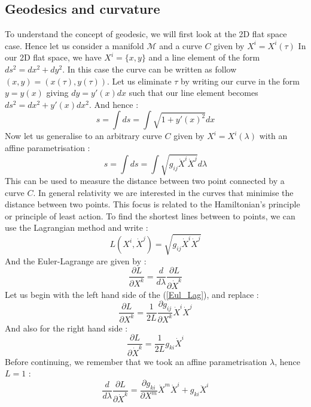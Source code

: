 \documentclass[a4paper,12pt]{article}
\theoremstyle{definition}
\begin{document}
\subsection{Geodesics and curvature}
To understand the concept of geodesic, we will first look at the 2D flat space case.
Hence let us consider a manifold $\mathcal{M}$ and a curve $C$ given by $X^i=X^i(\tau)$
In our 2D flat space, we have $X^i=\{x,y\}$ and a line element of the form $ds^2=dx^2+dy^2$.
In this case the curve can be written as follow $(x,y)=(x(\tau),y(\tau))$.
Let us eliminate $\tau$ by writing our curve in the form $y=y(x)$ giving $dy=y'(x)dx$ such that our line element becomes $ds^2=dx^2+y'(x)dx^2$.
And hence :
\begin{equation*}
	s=\int ds=\int \sqrt{1+y'(x)^2}dx
\end{equation*}
Now let us generalise to an arbitrary curve $C$ given by $X^i=X^i(\lambda)$ with an affine parametrisation :
\begin{equation*}
	s=\int ds=\int \sqrt{g_{ij}\dot{X}^i\dot{X}^j}d\lambda
\end{equation*}
This can be used to measure the distance between two point connected by a curve $C$.
In general relativity we are interested in the curves that minimise the distance between two points.
This focus is related to the Hamiltonian's principle or principle of least action.
To find the shortest lines between to points, we can use the Lagrangian method and write :
\begin{equation*}
	L(X^i,\dot{X}^j)=\sqrt{g_{ij}\dot{X}^i\dot{X}^j}
\end{equation*}
And the Euler-Lagrange are given by :
\begin{equation}\label{Eul_Lag}
	\frac{\partial L}{\partial X^k}=\frac{d}{d\lambda}\frac{\partial L}{\partial \dot{X}^k}
\end{equation}
Let us begin with the left hand side of the (\ref{Eul_Lag}), and replace :
\begin{equation*}
	\frac{\partial L}{\partial X^k}=\frac{1}{2L}\frac{\partial g_{ij}}{\partial X^k}\dot{X}^i\dot{X}^j
\end{equation*}
And also for the right hand side :
\begin{equation*}
	\frac{\partial L}{\partial \dot{X}^k}=\frac{1}{2L}g_{ki}\dot{X}^i
\end{equation*}
Before continuing, we remember that we took an affine parametrisation $\lambda$, hence $L=1$ :
\begin{equation*}
	\frac{d}{d\lambda}\frac{\partial L}{\partial \dot{X}^k}=
	\frac{\partial g_{ki}}{\partial X^m}\dot{X}^m\dot{X}^i+g_{ki}\ddot{X}^i
\end{equation*}
\end{document}

